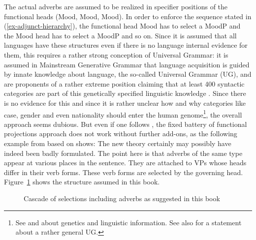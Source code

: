 The actual adverbs are assumed to be realized in specifier positions of the functional heads
(Mood, Mood, Mood).
In order to enforce the sequence stated in (\ref{ex-adjunct-hierarchy}), the functional head Mood has to select a MoodP and
the Mood head has to select a MoodP and so on. 
%
Since it is assumed that all languages have these structures even if there is no language internal
evidence for them, this requires a rather strong conception of Universal
Grammar: it is assumed in Mainstream Generative Grammar that language acquisition is guided by
innate knowledge about language, the so-called Universal Grammar (UG), and \citet{CR2010a} are proponents of a rather extreme position
claiming that at least 400 syntactic categories are part of this genetically specified linguistic
knowledge \citep[]{CR2010a}. Since there is no evidence for this and since it is rather unclear how and why categories
like case, gender and even nationality \parencites[, 99, 100]{Cinque94a-u}[114]{Scott2002a-u} should enter the human genome\footnote{
  See \citet{Bishop2002a} and \citet*{EBJKSPP96a} about genetics and linguistic information. See
  also \citet*{HCF2002a} for a statement about a rather general UG.
}, the overall approach seems
dubious. But even if one follows \citeauthor{CR2010a}, the fixed battery of functional projections
approach does not work without further add-ons, as the following example from
\citet[]{Haider2022a} based on  shows:
\eanoraggedright
The new theory certainly may possibly have indeed been badly formulated.
\z
The point here is that adverbs of the same type appear at various places in the sentence. They are
attached to VPs whose heads differ in their verb forms. These verb forms are selected by the governing
head. Figure~\ref{fig-verbal-selection} shows the structure assumed in this book.
\begin{figure}
\caption{Cascade of selections including adverbs as suggested in this book}\label{fig-verbal-selection}
\end{figure}

